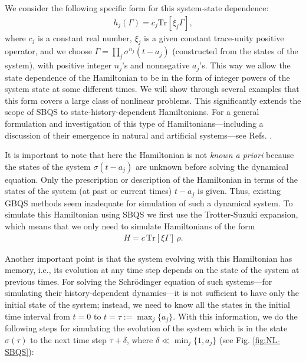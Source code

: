 \documentclass[aps,pra,twocolumn,floatfix,groupedaddress,superscriptaddress,nofootinbib,notitlepage]{revtex4-2}
\begin{document}
We consider the following specific form for this system-state dependence:
\begin{align}
h_{j}(\Gamma) = c_{j}\mathrm{Tr}[\xi_{j}\Gamma],
\label{hNL}
\end{align}
where $c_{j}$ is a constant real number, $\xi_{j}$ is a given constant trace-unity positive operator,  and we choose $\Gamma = \prod_{j} \sigma^{n_{j}}(t-a_{j})$ (constructed from the states of the system), with positive integer $n_{j}$'s and nonnegative $a_{j}$'s. This way we allow the state dependence of the Hamiltonian to be in the form of integer powers of the system state at some different times. We will show through several examples that this form covers a  large class of nonlinear problems. This significantly extends the scope of SBQS to state-history-dependent Hamiltonians. For a general formulation and investigation of this type of Hamiltonians---including a discussion of their emergence in natural and artificial systems---see Refs. \cite{ECQT-Tavanfar, ECQT}.

It is important to note that here the Hamiltonian is not \textit{known a priori} because the states of the system $\sigma(t-a_{j})$ are unknown before solving the dynamical equation. Only the prescription or description of the Hamiltonian in terms of the states of the system (at past or current times) $t-a_{j}$ is given. Thus, existing GBQS methods seem inadequate for simulation of such a dynamical system. To simulate this Hamiltonian using SBQS we first use the Trotter-Suzuki expansion, which means that we only need to simulate Hamiltonians of the form 
\begin{align}
H=c\,\mathrm{Tr}[\xi \Gamma] \,\rho.
\label{NLH}
\end{align}
 
Another important point is that the system evolving with this Hamiltonian has memory, i.e., its evolution at any time step depends on the state of the system at previous times. For solving the Schr\"{o}dinger equation of such systems---for simulating their history-dependent dynamics---it is not sufficient to have only the initial state of the system; instead, we need to know all the states in the initial time interval from $t=0$ to $t=\tau:=\max_{j} \{a_{j}\}$. With this information, we do the following steps for simulating the evolution of the system which is in the state $\sigma(\tau)$ to the next time step $\tau+\delta$, where $\delta \ll \min_{j}\{1,a_{j}\}$ (see Fig. \ref{fig:NL-SBQS}):\\
 
\end{document}
